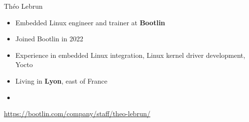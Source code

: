 \begin{frame}{Théo Lebrun}
  \begin{itemize}
  \item Embedded Linux engineer and trainer at {\bf Bootlin}
  \item Joined Bootlin in 2022
  \item Experience in embedded Linux integration, Linux kernel driver
    development, Yocto
  \item Living in {\bf Lyon}, east of France
  \item {}
  \end{itemize}
  {\small \url{https://bootlin.com/company/staff/theo-lebrun/}}
\end{frame}
